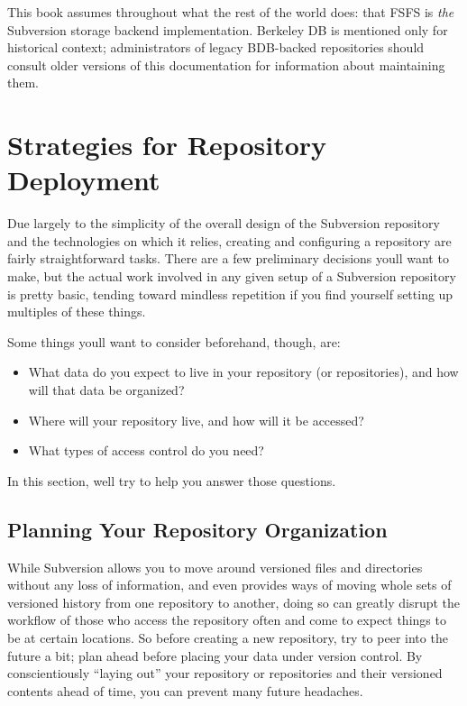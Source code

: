 This book assumes throughout what the rest of the world does: that FSFS
is \emph{the} Subversion storage backend implementation. Berkeley DB is
mentioned only for historical context; administrators of legacy
BDB-backed repositories should consult older versions of this
documentation for information about maintaining them.

\section{Strategies for Repository
Deployment}\label{svn.reposadmin.planning}

Due largely to the simplicity of the overall design of the Subversion
repository and the technologies on which it relies, creating and
configuring a repository are fairly straightforward tasks. There are a
few preliminary decisions you\textquotesingle ll want to make, but the
actual work involved in any given setup of a Subversion repository is
pretty basic, tending toward mindless repetition if you find yourself
setting up multiples of these things.

Some things you\textquotesingle ll want to consider beforehand, though,
are:

\begin{itemize}
\item
  What data do you expect to live in your repository (or repositories),
  and how will that data be organized?
\item
  Where will your repository live, and how will it be accessed?
\item
  What types of access control do you need?
\end{itemize}

In this section, we\textquotesingle ll try to help you answer those
questions.

\subsection{Planning Your Repository
Organization}\label{svn.reposadmin.projects.chooselayout}

While Subversion allows you to move around versioned files and
directories without any loss of information, and even provides ways of
moving whole sets of versioned history from one repository to another,
doing so can greatly disrupt the workflow of those who access the
repository often and come to expect things to be at certain locations.
So before creating a new repository, try to peer into the future a bit;
plan ahead before placing your data under version control. By
conscientiously ``laying out'' your repository or repositories and their
versioned contents ahead of time, you can prevent many future headaches.

